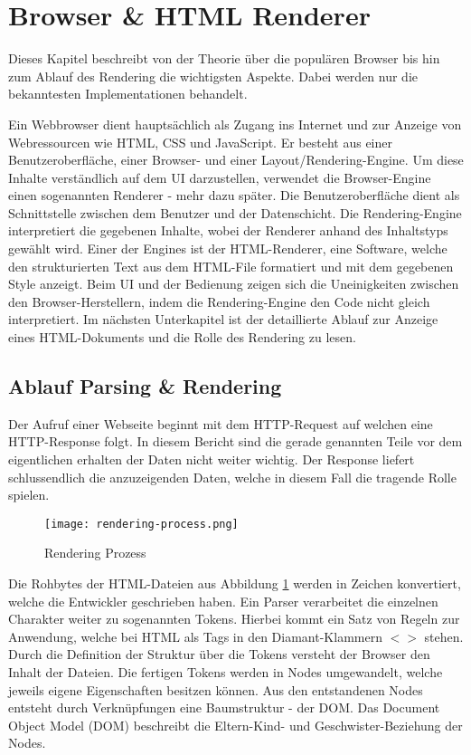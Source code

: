 \section{Browser \& HTML Renderer}

Dieses Kapitel beschreibt von der Theorie über die populären Browser bis hin zum Ablauf des Rendering die wichtigsten Aspekte.
Dabei werden nur die bekanntesten Implementationen behandelt.

Ein Webbrowser dient hauptsächlich als Zugang ins Internet und zur Anzeige von Webressourcen wie HTML, CSS und JavaScript.
Er besteht aus einer Benutzeroberfläche, einer Browser- und einer Layout/Rendering-Engine.
Um diese Inhalte verständlich auf dem UI darzustellen, verwendet die Browser-Engine einen sogenannten Renderer - mehr dazu später.
Die Benutzeroberfläche dient als Schnittstelle zwischen dem Benutzer und der Datenschicht. 
Die Rendering-Engine interpretiert die gegebenen Inhalte, wobei der Renderer anhand des Inhaltstyps gewählt wird. 
Einer der Engines ist der HTML-Renderer, eine Software, welche den strukturierten Text aus dem HTML-File formatiert und mit dem gegebenen Style anzeigt.
Beim UI und der Bedienung zeigen sich die Uneinigkeiten zwischen den Browser-Herstellern, indem die Rendering-Engine den Code nicht gleich interpretiert.
Im nächsten Unterkapitel ist der detaillierte Ablauf zur Anzeige eines HTML-Dokuments und die Rolle des Rendering zu lesen.


\subsection{Ablauf Parsing \& Rendering}

Der Aufruf einer Webseite beginnt mit dem HTTP-Request auf welchen eine HTTP-Response folgt.
In diesem Bericht sind die gerade genannten Teile vor dem eigentlichen erhalten der Daten nicht weiter wichtig.
Der Response liefert schlussendlich die anzuzeigenden Daten, welche in diesem Fall die tragende Rolle spielen.

\begin{figure}[!htb]
    \centering
    \texttt{[image: rendering-process.png]}
    \caption{Rendering Prozess}
    \label{img:RenderingProcess}
\end{figure}

Die Rohbytes der HTML-Dateien aus Abbildung \ref{img:RenderingProcess} werden in Zeichen konvertiert, welche die Entwickler geschrieben haben.
Ein Parser verarbeitet die einzelnen Charakter weiter zu sogenannten Tokens.
Hierbei kommt ein Satz von Regeln zur Anwendung, welche bei HTML als Tags in den Diamant-Klammern $<>$ stehen.
Durch die Definition der Struktur über die Tokens versteht der Browser den Inhalt der Dateien.
Die fertigen Tokens werden in Nodes umgewandelt, welche jeweils eigene Eigenschaften besitzen können.
Aus den entstandenen Nodes entsteht durch Verknüpfungen eine Baumstruktur - der DOM.
Das Document Object Model (DOM) beschreibt die Eltern-Kind- und Geschwister-Beziehung der Nodes.

